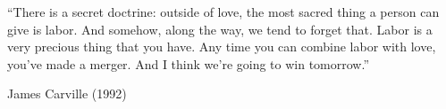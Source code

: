 ``There is a secret doctrine:
outside of love, the most sacred thing a person can give is labor.
And somehow, along the way, we tend to forget that.
Labor is a very precious thing that you have.
Any time you can combine labor with love, you’ve made a merger.
And I think we’re going to win tomorrow.''

James Carville (1992)
